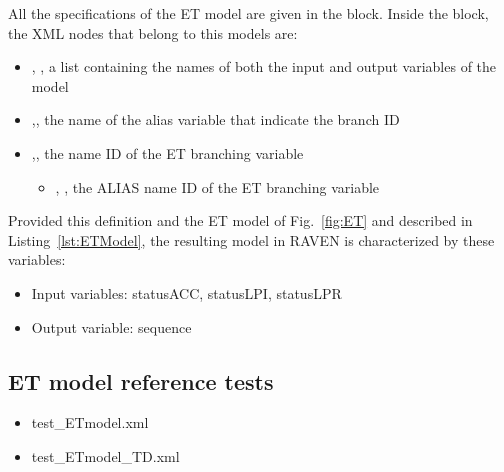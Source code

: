 All the specifications of the ET model are given in the 
 block. 
Inside the  block, the XML
nodes that belong to this models are:
\begin{itemize}
  \item  {}, , a list containing the names of both the input and output variables of the model
  \item  {},, the name of the alias variable that indicate the branch ID
  \item  {},, the name ID of the ET branching variable
	  \begin{itemize}
	    \item {}, , the ALIAS name ID of the ET branching variable
	  \end{itemize}
\end{itemize}

Provided this definition and the ET model of Fig.~\ref{fig:ET} and described in Listing~\ref{lst:ETModel}, 
the resulting model in RAVEN is characterized by these variables:
\begin{itemize}
	\item Input variables: statusACC, statusLPI, statusLPR
	\item Output variable: sequence
\end{itemize}

\subsection{ET model reference tests}
\begin{itemize}
	\item test\_ETmodel.xml
	\item test\_ETmodel\_TD.xml
\end{itemize}



